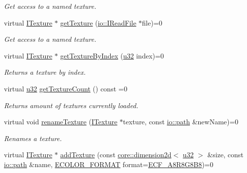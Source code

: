 \begin{DoxyCompactItemize}
\begin{DoxyCompactList}\small\item\em Get access to a named texture. \end{DoxyCompactList}\item 
virtual \hyperlink{classirr_1_1video_1_1ITexture}{I\+Texture} $\ast$ \hyperlink{classirr_1_1video_1_1IVideoDriver_aaf989c8688ffe2a28a4b8e7b6ec2bce7}{get\+Texture} (\hyperlink{classirr_1_1io_1_1IReadFile}{io\+::\+I\+Read\+File} $\ast$file)=0
\begin{DoxyCompactList}\small\item\em Get access to a named texture. \end{DoxyCompactList}\item 
virtual \hyperlink{classirr_1_1video_1_1ITexture}{I\+Texture} $\ast$ \hyperlink{classirr_1_1video_1_1IVideoDriver_abfe395b1320ac52cea6be0e912135351}{get\+Texture\+By\+Index} (\hyperlink{namespaceirr_a0416a53257075833e7002efd0a18e804}{u32} index)=0
\begin{DoxyCompactList}\small\item\em Returns a texture by index. \end{DoxyCompactList}\item 
virtual \hyperlink{namespaceirr_a0416a53257075833e7002efd0a18e804}{u32} \hyperlink{classirr_1_1video_1_1IVideoDriver_a4c3f976980dd8387db37feca8c8e2d73}{get\+Texture\+Count} () const =0
\begin{DoxyCompactList}\small\item\em Returns amount of textures currently loaded. \end{DoxyCompactList}\item 
virtual void \hyperlink{classirr_1_1video_1_1IVideoDriver_a2cefddb9ebd7f46ee946c04b301a5c5b}{rename\+Texture} (\hyperlink{classirr_1_1video_1_1ITexture}{I\+Texture} $\ast$texture, const \hyperlink{namespaceirr_1_1io_a6468281622ce3a1c46b72e19f32dded5}{io\+::path} \&new\+Name)=0
\begin{DoxyCompactList}\small\item\em Renames a texture. \end{DoxyCompactList}\item 
virtual \hyperlink{classirr_1_1video_1_1ITexture}{I\+Texture} $\ast$ \hyperlink{classirr_1_1video_1_1IVideoDriver_a8c02ee280bb738cdf38b77e7a798244e}{add\+Texture} (const \hyperlink{classirr_1_1core_1_1dimension2d}{core\+::dimension2d}$<$ \hyperlink{namespaceirr_a0416a53257075833e7002efd0a18e804}{u32} $>$ \&size, const \hyperlink{namespaceirr_1_1io_a6468281622ce3a1c46b72e19f32dded5}{io\+::path} \&name, \hyperlink{namespaceirr_1_1video_a1d5e487888c32b1674a8f75116d829ed}{E\+C\+O\+L\+O\+R\+\_\+\+F\+O\+R\+M\+AT} format=\hyperlink{namespaceirr_1_1video_a1d5e487888c32b1674a8f75116d829edac3d45e946a56d11bd43dc18661dfe7ec}{E\+C\+F\+\_\+\+A8\+R8\+G8\+B8})=0

\end{DoxyCompactItemize}
